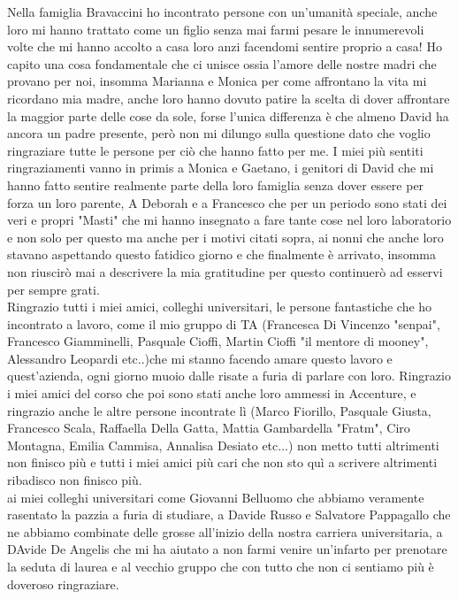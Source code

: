Nella famiglia Bravaccini ho incontrato persone con un'umanità speciale, anche loro mi hanno trattato come un figlio senza mai farmi pesare le innumerevoli volte che mi hanno accolto a casa loro anzi facendomi sentire proprio a casa! Ho capito una cosa fondamentale che ci unisce ossia l'amore delle nostre madri che provano per noi, insomma Marianna e Monica per come affrontano la vita mi ricordano mia madre, anche loro hanno dovuto patire la scelta di dover affrontare la maggior parte delle cose da sole, forse l'unica differenza è che almeno David ha ancora un padre presente, però non mi dilungo sulla questione dato che voglio ringraziare tutte le persone per ciò che hanno fatto per me. I miei più sentiti ringraziamenti vanno in primis a Monica e Gaetano, i genitori di David che mi hanno fatto sentire realmente parte della loro famiglia senza dover essere per forza un loro parente, A Deborah e a Francesco che per un periodo sono stati dei veri e propri "Masti" che mi hanno insegnato a fare tante cose nel loro laboratorio e non solo per questo ma anche per i motivi citati sopra, ai nonni che anche loro stavano aspettando questo fatidico giorno e che finalmente è arrivato, insomma non riuscirò mai a descrivere la mia gratitudine per questo continuerò ad esservi per sempre grati.\\


Ringrazio tutti i miei amici, colleghi universitari, le persone fantastiche che ho incontrato a lavoro, come il mio gruppo di TA (Francesca Di Vincenzo "senpai", Francesco Giamminelli, Pasquale Cioffi, Martin Cioffi "il mentore di mooney",  Alessandro Leopardi etc..)che mi stanno facendo amare questo lavoro e quest'azienda, ogni giorno muoio dalle risate a furia di parlare con loro. Ringrazio i miei amici del corso che poi sono stati anche loro ammessi in Accenture, e ringrazio anche le altre persone incontrate lì (Marco Fiorillo, Pasquale Giusta, Francesco Scala, Raffaella Della Gatta, Mattia Gambardella "Fratm", Ciro Montagna, Emilia Cammisa, Annalisa Desiato etc...) non metto tutti altrimenti non finisco più e tutti i miei amici più cari che non sto quì a scrivere altrimenti ribadisco non finisco più.\\

ai miei colleghi universitari come Giovanni Belluomo che abbiamo veramente rasentato la pazzia a furia di studiare, a Davide Russo e Salvatore Pappagallo che ne abbiamo combinate delle grosse all'inizio della nostra carriera universitaria, a DAvide De Angelis che mi ha aiutato a non farmi venire un'infarto per prenotare la seduta di laurea e al vecchio gruppo che con tutto che non ci sentiamo più è doveroso ringraziare.


